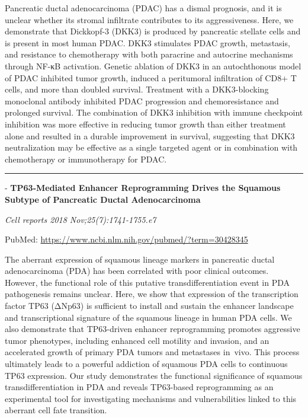 \documentclass[]{article}
\begin{document}
Pancreatic ductal adenocarcinoma (PDAC) has a dismal prognosis, and it
is unclear whether its stromal infiltrate contributes to its
aggressiveness. Here, we demonstrate that Dickkopf-3 (DKK3) is produced
by pancreatic stellate cells and is present in most human PDAC. DKK3
stimulates PDAC growth, metastasis, and resistance to chemotherapy with
both paracrine and autocrine mechanisms through NF-κB activation.
Genetic ablation of DKK3 in an autochthonous model of PDAC inhibited
tumor growth, induced a peritumoral infiltration of CD8+ T cells, and
more than doubled survival. Treatment with a DKK3-blocking monoclonal
antibody inhibited PDAC progression and chemoresistance and prolonged
survival. The combination of DKK3 inhibition with immune checkpoint
inhibition was more effective in reducing tumor growth than either
treatment alone and resulted in a durable improvement in survival,
suggesting that DKK3 neutralization may be effective as a single
targeted agent or in combination with chemotherapy or immunotherapy for
PDAC.

{}

{}

\begin{center}\rule{0.5\linewidth}{\linethickness}\end{center}

 - \textbf{TP63-Mediated Enhancer Reprogramming Drives the Squamous
Subtype of Pancreatic Ductal Adenocarcinoma}

\emph{Cell reports 2018 Nov;25(7):1741-1755.e7}

PubMed: \url{https://www.ncbi.nlm.nih.gov/pubmed/?term=30428345}

The aberrant expression of squamous lineage markers in pancreatic ductal
adenocarcinoma (PDA) has been correlated with poor clinical outcomes.
However, the functional role of this putative transdifferentiation event
in PDA pathogenesis remains unclear. Here, we show that expression of
the transcription factor TP63 (ΔNp63) is sufficient to install and
sustain the enhancer landscape and transcriptional signature of the
squamous lineage in human PDA cells. We also demonstrate that
TP63-driven enhancer reprogramming promotes aggressive tumor phenotypes,
including enhanced cell motility and invasion, and an accelerated growth
of primary PDA tumors and metastases in~vivo. This process ultimately
leads to a powerful addiction of squamous PDA cells to continuous TP63
expression. Our study demonstrates the functional significance of
squamous transdifferentiation in PDA and reveals TP63-based
reprogramming as an experimental tool for investigating mechanisms and
vulnerabilities linked to this aberrant cell fate transition.
\end{document}
